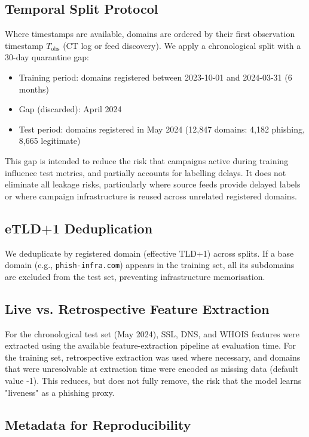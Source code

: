\documentclass[conference]{IEEEtran}
\begin{document}
\subsection{Temporal Split Protocol}

Where timestamps are available, domains are ordered by their first observation timestamp $T_{\text{obs}}$ (CT log or feed discovery). We apply a chronological split with a 30-day quarantine gap:

\begin{itemize}
    \item Training period: domains registered between 2023-10-01 and 2024-03-31 (6 months)
    \item Gap (discarded): April 2024
    \item Test period: domains registered in May 2024 (12,847 domains: 4,182 phishing, 8,665 legitimate)
\end{itemize}

This gap is intended to reduce the risk that campaigns active during training influence test metrics, and partially accounts for labelling delays. It does not eliminate all leakage risks, particularly where source feeds provide delayed labels or where campaign infrastructure is reused across unrelated registered domains.

\subsection{eTLD+1 Deduplication}

We deduplicate by registered domain (effective TLD+1) across splits. If a base domain (e.g., \texttt{phish-infra.com}) appears in the training set, all its subdomains are excluded from the test set, preventing infrastructure memorisation.

\subsection{Live vs. Retrospective Feature Extraction}

For the chronological test set (May 2024), SSL, DNS, and WHOIS features were extracted using the available feature-extraction pipeline at evaluation time. For the training set, retrospective extraction was used where necessary, and domains that were unresolvable at extraction time were encoded as missing data (default value -1). This reduces, but does not fully remove, the risk that the model learns "liveness" as a phishing proxy.

\subsection{Metadata for Reproducibility}
\end{document}
